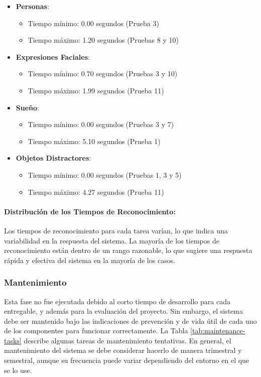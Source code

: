 \begin{itemize}
\item \textbf{Personas}:
\begin{itemize}
	\item Tiempo mínimo: 0.00 segundos (Prueba 3)
	\item Tiempo máximo: 1.20 segundos (Pruebas 8 y 10)
\end{itemize}
\item \textbf{Expresiones Faciales}:
\begin{itemize}
	\item Tiempo mínimo: 0.70 segundos (Pruebas 3 y 10)
	\item Tiempo máximo: 1.99 segundos (Prueba 11)
\end{itemize}
\item \textbf{Sueño}:
\begin{itemize}
	\item Tiempo mínimo: 0.00 segundos (Pruebas 3 y 7)
	\item Tiempo máximo: 5.10 segundos (Prueba 1)
\end{itemize}
\item \textbf{Objetos Distractores}:
\begin{itemize}
	\item Tiempo mínimo: 0.00 segundos (Pruebas 1, 3 y 5)
	\item Tiempo máximo: 4.27 segundos (Prueba 11)
\end{itemize}
\end{itemize}

\paragraph{Distribución de los Tiempos de Reconocimiento:}
Los tiempos de reconocimiento para cada tarea varían, lo que indica una variabilidad en la respuesta del sistema. La mayoría de los tiempos de reconocimiento están dentro de un rango razonable, lo que sugiere una respuesta rápida y efectiva del sistema en la mayoría de los casos.

\subsubsection{Mantenimiento}
Esta fase no fue ejecutada debido al corto tiempo de desarrollo para cada entregable, y además para la evaluación del proyecto. Sin embargo, el sistema debe ser mantenido bajo las indicaciones de prevención y de vida útil de cada uno de los componentes para funcionar correctamente. La Tabla \ref{tab:maintenance-tasks} describe algunas tareas de mantenimiento tentativas. En general, el mantenimiento del sistema se debe considerar hacerlo de manera trimestral y semestral, aunque su frecuencia puede variar dependiendo del entorno en el que se lo use.


